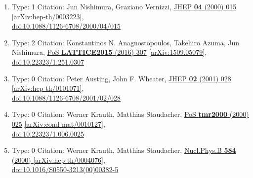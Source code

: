 \documentclass[a4paper,10pt]{article}
\begin{document}
\begin{enumerate}
\begin{enumerate}
  \item Type: 1 Citation: Jun Nishimura, Graziano Vernizzi, \href{https://www.doi.org/10.1088/1126-6708/2000/04/015}{JHEP {\bf 04} (2000) 015}  \href{https://arxiv.org/abs/hep-th/0003223}{[arXiv:hep-th/0003223]},\\\href{https://www.doi.org/10.1088/1126-6708/2000/04/015}{doi:10.1088/1126-6708/2000/04/015}
  \item Type: 2 Citation: Konstantinos N. Anagnostopoulos, Takehiro Azuma, Jun Nishimura, \href{https://www.doi.org/10.22323/1.251.0307}{PoS {\bf LATTICE2015} (2016) 307}  \href{https://arxiv.org/abs/1509.05079}{[arXiv:1509.05079]},\\\href{https://www.doi.org/10.22323/1.251.0307}{doi:10.22323/1.251.0307}
  \item Type: 0 Citation: Peter Austing, John F. Wheater, \href{https://www.doi.org/10.1088/1126-6708/2001/02/028}{JHEP {\bf 02} (2001) 028}  \href{https://arxiv.org/abs/hep-th/0101071}{[arXiv:hep-th/0101071]},\\\href{https://www.doi.org/10.1088/1126-6708/2001/02/028}{doi:10.1088/1126-6708/2001/02/028}
  \item Type: 0 Citation: Werner Krauth, Matthias Staudacher, \href{https://www.doi.org/10.22323/1.006.0025}{PoS {\bf tmr2000} (2000) 025}  \href{https://arxiv.org/abs/cond-mat/0010127}{[arXiv:cond-mat/0010127]},\\\href{https://www.doi.org/10.22323/1.006.0025}{doi:10.22323/1.006.0025}
  \item Type: 0 Citation: Werner Krauth, Matthias Staudacher, \href{https://www.doi.org/10.1016/S0550-3213(00)00382-5}{Nucl.Phys.B {\bf 584} (2000) }  \href{https://arxiv.org/abs/hep-th/0004076}{[arXiv:hep-th/0004076]},\\\href{https://www.doi.org/10.1016/S0550-3213(00)00382-5}{doi:10.1016/S0550-3213(00)00382-5}

\end{enumerate}
\end{enumerate}
\end{document}
